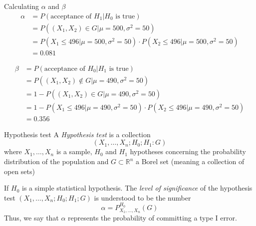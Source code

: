 \documentclass{beamer}
\begin{document}
\begin{frame}{Calculating $\alpha$ and $\beta$}
	\begin{equation*}
		\begin{split}
			\alpha& = P(\text{acceptance of }H_1 | H_0\text{ is true}) \\ 
			& = P((X_1,X_2)\in G| \mu=500, \sigma^2=50) \\
			&=  P(X_1\le 496| \mu=500, \sigma^2=50) \cdot  P(X_2\le 496| \mu=500, \sigma^2=50)\\
			&= 0.081
		\end{split}
	\end{equation*}
	
	\begin{equation*}
		\begin{split}
			\beta& = P(\text{acceptance of }H_0 | H_1\text{ is true}) \\ 
			& = P((X_1,X_2)\notin G| \mu=490, \sigma^2=50) \\
			&= 1-P((X_1,X_2)\in G| \mu=490, \sigma^2=50) \\
			&=  1-P(X_1\le 496| \mu=490, \sigma^2=50) \cdot  P(X_2\le 496| \mu=490, \sigma^2=50)\\
			&= 0.356
		\end{split}
	\end{equation*}
\end{frame}

\begin{frame}{Hypothesis test}
	A \textit{Hypothesis test} is a collection
	\begin{equation*}
		(X_1,\ldots, X_n; H_0; H_1: G)
	\end{equation*}
 where $X_1,\ldots, X_n$ is a sample, $H_0$ and $H_1$ hypotheses concerning the probability distribution of the population and $G\subset \mathbb{R}^n$ a Borel set (meaning a collection of open sets)
 
 If $H_0$ is a simple statistical hypothesis. The \textit{level of significance} of the hypothesis test $(X_1,\ldots, X_n; H_0;H_1;G)$ is understood to be the number
 \begin{equation*}
 	\alpha = P_{X_1,\ldots, X_n}^{H_0}(G)
 \end{equation*}
Thus, we say that $\alpha$ represents the probability of committing a type I error.
\end{frame}
\end{document}
